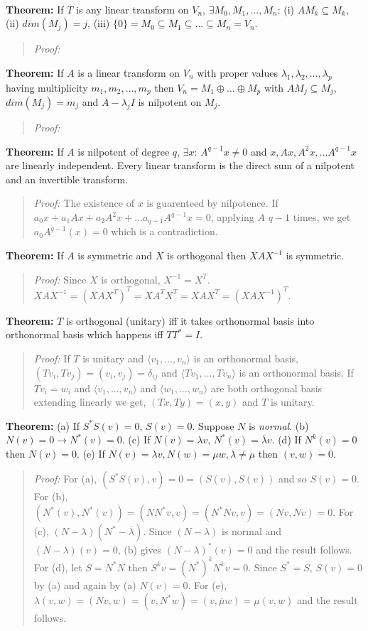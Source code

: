 \\
{\bf Theorem:}
If $T$ is any linear transform on $V_n$, $\exists M_0 , M_1 , \ldots , M_n$:
(i) $AM_k \subseteq M_k$, (ii) $dim (M_j )= j$, (iii)
$\{0\} = M_0 \subseteq M_1 \subseteq \ldots \subseteq M_n= V_n$.
\begin{quote}
\emph{Proof:}
\end{quote}
{\bf Theorem:}
If $A$ is a linear transform on $V_n$ with proper values
$\lambda_1 , \lambda_2 ,  \ldots , \lambda_p$ having multiplicity
$m_1 , m_2 ,  \ldots , m_p$ then $V_n =  M_1 \oplus \ldots \oplus M_p$ with
$AM_j \subseteq M_j$, $dim(M_j ) = m_j$ and $A- \lambda_j I$
is nilpotent on $M_j$.
\begin{quote}
\emph{Proof:}
\end{quote}
{\bf Theorem:}
If $A$ is nilpotent of degree $q$, $\exists x$: $A^{q-1}x \ne 0$ and
$x , Ax , A^2 x, \ldots A^{q-1} x$ are linearly independent.  
Every linear transform is the direct sum of a nilpotent and an invertible transform.
\begin{quote}
\emph{Proof:} 
The existence of $x$ is guarenteed by nilpotence.
If $a_0 x +  a_1 Ax + a_2 A^2 x  + \ldots a_{q-1} A^{q-1} x = 0$, applying $A$
$q-1$ times, we get  $a_0 A^{q-1}(x)= 0$ which is a contradiction. 
\end{quote}
{\bf Theorem:}
If $A$ is symmetric and $X$ is orthogonal then $X A X^{-1}$ is symmetric.
\begin{quote}
\emph{Proof:}  Since $X$ is orthogonal, $X^{-1} = X^T$.
$X A X^{-1} = (X A X^T)^T = X A^T X^T = X A X^T = (X A X^{-1})^T$.
\end{quote}
{\bf Theorem:}
$T$ is orthogonal (unitary) iff it takes orthonormal basis into orthonormal basis
which happens iff $TT^*=I$.  
\begin{quote}
\emph{Proof:} 
If $T$ is unitary and $\langle v_1, \ldots , v_n \rangle$ is an orthonormal basis,
$(Tv_i, Tv_j)= (v_i, v_j)= \delta_{ij}$ and $\langle Tv_1 , \ldots , Tv_n \rangle$ is
an orthonormal basis.
If $T v_i = w_i$ and 
$\langle v_1 , \ldots , v_n \rangle$ and $\langle w_1 , \ldots , w_n \rangle$ 
are both orthogonal basis extending linearly we get, $(Tx, Ty)= (x,y)$ and $T$ is unitary.
\end{quote}
{\bf Theorem:}  (a) If $S^*S(v)=0$, $S(v)= 0$.
Suppose $N$ is \emph{normal}. 
(b) $N(v)= 0 \rightarrow N^*(v)= 0$.
(c) If $N(v)= \lambda v$, $N^*(v)= {\overline {\lambda}} v$. 
(d) If $N^k(v)=0$ then $N(v)=0$.
(e) If $N(v)= \lambda v, N(w)= \mu w, \lambda \ne \mu$ then $(v,w)= 0$.
\begin{quote}
\emph{Proof:} 
For (a), $(S^*S(v),v) = 0 = (S(v), S(v))$ and so $S(v)= 0$.
For (b), $(N^*(v), N^*(v))= (NN^*v,v)= (N^*Nv,v)=(Nv,Nv)=0$.
For (c), $(N-\lambda) (N^*-{\overline {\lambda}}) $.  Since 
$(N-\lambda)$ is normal and
$(N-\lambda)(v)= 0$, (b) gives
$(N-\lambda)^*(v)= 0$ and the result follows.
For (d), let $S=N^*N$ then $S^k v= (N^*)^k N^k v= 0$.  Since $S^*=S$, $S(v)= 0$ by
(a) and again by (a) $N(v)= 0$.
For (e), $\lambda (v,w)= (Nv,w)= (v, N^* w)= (v, {\overline {\mu}} w)= \mu (v,w)$ and
the result follows.
\end{quote}
